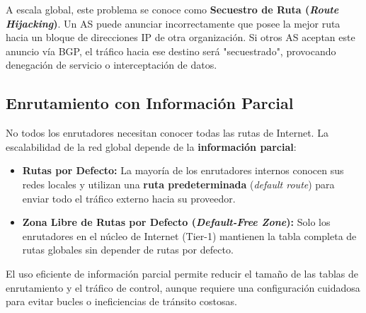 A escala global, este problema se conoce como \textbf{Secuestro de Ruta (\textit{Route Hijacking})}. Un AS puede anunciar incorrectamente que posee la mejor ruta hacia un bloque de direcciones IP de otra organización. Si otros AS aceptan este anuncio vía BGP, el tráfico hacia ese destino será "secuestrado", provocando denegación de servicio o interceptación de datos.

\subsection{Enrutamiento con Información Parcial}

No todos los enrutadores necesitan conocer todas las rutas de Internet. La escalabilidad de la red global depende de la \textbf{información parcial}:

\begin{itemize}
    \item \textbf{Rutas por Defecto:} La mayoría de los enrutadores internos conocen sus redes locales y utilizan una \textbf{ruta predeterminada} (\textit{default route}) para enviar todo el tráfico externo hacia su proveedor.
    \item \textbf{Zona Libre de Rutas por Defecto (\textit{Default-Free Zone}):} Solo los enrutadores en el núcleo de Internet (Tier-1) mantienen la tabla completa de rutas globales sin depender de rutas por defecto.
\end{itemize}

El uso eficiente de información parcial permite reducir el tamaño de las tablas de enrutamiento y el tráfico de control, aunque requiere una configuración cuidadosa para evitar bucles o ineficiencias de tránsito costosas.
